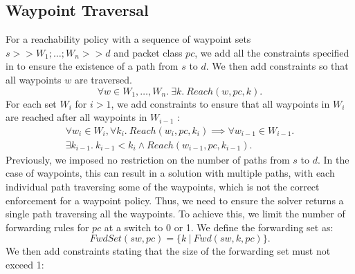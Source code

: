 \subsection{Waypoint Traversal} \label{sec:waypoint}
For a reachability policy with a sequence of waypoint sets $s >> W_1;\ldots;W_n >> d$ and packet class $pc$, we add all the constraints specified in  to ensure the existence of a path from $s$ to $d$. We then add constraints so that all waypoints $w$
are traversed. 
\begin{equation} \label{eq:waypoints}
	\forall w \in W_1, \ldots, W_n. \ \exists k.~Reach(w, pc, k).
\end{equation}
For each set $W_i$ for $i>1$, we add constraints to ensure that all waypoints
in $W_i$ are reached after all waypoints in $W_{i - 1}$ : 
\begin{multline}
\forall w_{i} \in W_{i}, \forall k_i.~Reach(w_i, pc, k_i) \implies 
\forall w_{i - 1} \in W_{i-1}. \\ \exists k_{i-1}. \ 
 k_{i-1} < k_{i} \wedge Reach(w_{i-1}, pc, k_{i-1}).
\end{multline}
Previously, we imposed no restriction on the number of paths 
from $s$ to $d$. In the case of waypoints, this can result in 
a solution with multiple paths, with each individual path traversing
some of the waypoints, which is not the correct enforcement for a waypoint policy.
Thus, we need to ensure the solver returns a single path traversing
all the waypoints. To achieve this, we limit the number of
forwarding rules for $pc$ at a switch to 0 or 1. 
We define the forwarding set as:
\begin{equation}
	FwdSet(sw,pc) = \{k \ | \ Fwd(sw,k,pc)\}.
\end{equation}
We then add constraints stating that the size of the forwarding set must not exceed 1:
